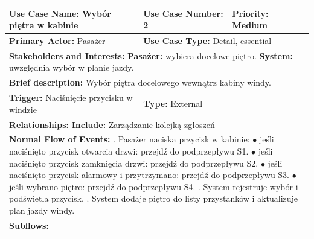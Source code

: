 \documentclass[a4paper,12pt]{article}
\begin{document}
\pagebreak

\begin{table}[h]
\centering
\begin{tabular}{|p{}|p{}|p{}|}
\hline
\textbf{Use Case Name:} Wybór piętra w kabinie & \textbf{Use Case Number:} 2 & \textbf{Priority:} Medium \\ \hline
\textbf{Primary Actor:} Pasażer & \multicolumn{2}{l|}{\textbf{Use Case Type:} Detail, essential} \\ \hline
\multicolumn{3}{|p{0.9\textwidth}|}{\textbf{Stakeholders and Interests:} \newline
\textbf{Pasażer:} wybiera docelowe piętro. \newline
\textbf{System:} uwzględnia wybór w planie jazdy.} \\ \hline
\multicolumn{3}{|p{0.9\textwidth}|}{\textbf{Brief description:} Wybór piętra docelowego wewnątrz kabiny windy.} \\ \hline
\textbf{Trigger:} Naciśnięcie przycisku w windzie & \multicolumn{2}{l|}{\textbf{Type:} External} \\ \hline
\multicolumn{3}{|p{0.9\textwidth}|}{\textbf{Relationships:} \newline
\textbf{Include:} Zarządzanie kolejką zgłoszeń} \\ \hline
\multicolumn{3}{|p{0.9\textwidth}|}{\textbf{Normal Flow of Events:} \newline
1. Pasażer naciska przycisk w kabinie: \newline
\hspace*{10pt} $\bullet$ jeśli naciśnięto przycisk otwarcia drzwi: przejdź do podprzepływu S1. \newline
\hspace*{10pt} $\bullet$ jeśli naciśnięto przycisk zamknięcia drzwi: przejdź do podprzepływu S2. \newline
\hspace*{10pt} $\bullet$ jeśli naciśnięto przycisk alarmowy i przytrzymano: przejdź do podprzepływu S3. \newline
\hspace*{10pt} $\bullet$ jeśli wybrano piętro: przejdź do podprzepływu S4. \newline
2. System rejestruje wybór i podświetla przycisk. \newline
3. System dodaje piętro do listy przystanków i aktualizuje plan jazdy windy. \newline
} \\ \hline
\multicolumn{3}{|p{0.9\textwidth}|}{\textbf{Subflows:} \newline
}
\end{tabular}
\end{table}
\end{document}
